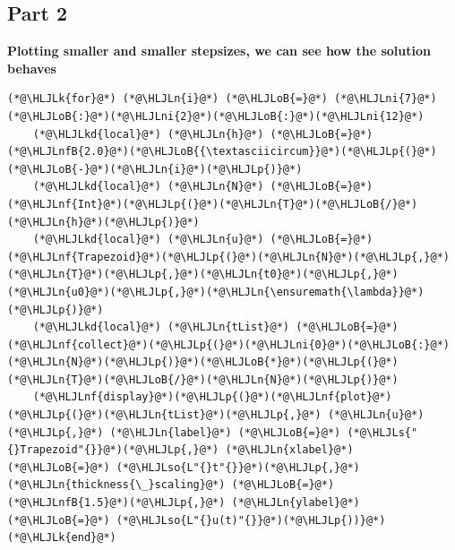 \documentclass[12pt,a4paper]{article}
\newcommand{\HLJLk}[1]{\textcolor[RGB]{148,91,176}{\textbf{#1}}}
\newcommand{\HLJLkd}[1]{\textcolor[RGB]{214,102,97}{\textit{#1}}}
\newcommand{\HLJLn}[1]{#1}
\newcommand{\HLJLnf}[1]{\textcolor[RGB]{66,102,213}{#1}}
\newcommand{\HLJLs}[1]{\textcolor[RGB]{201,61,57}{#1}}
\newcommand{\HLJLso}[1]{\textcolor[RGB]{201,61,57}{#1}}
\newcommand{\HLJLnfB}[1]{\textcolor[RGB]{59,151,46}{#1}}
\newcommand{\HLJLni}[1]{\textcolor[RGB]{59,151,46}{#1}}
\newcommand{\HLJLoB}[1]{\textcolor[RGB]{102,102,102}{\textbf{#1}}}
\newcommand{\HLJLp}[1]{#1}
\begin{document}
\subsection{Part 2}
\textbf{Plotting smaller and smaller stepsizes, we can see how the solution behaves}


\begin{lstlisting}
(*@\HLJLk{for}@*) (*@\HLJLn{i}@*) (*@\HLJLoB{=}@*) (*@\HLJLni{7}@*)(*@\HLJLoB{:}@*)(*@\HLJLni{2}@*)(*@\HLJLoB{:}@*)(*@\HLJLni{12}@*)
    (*@\HLJLkd{local}@*) (*@\HLJLn{h}@*) (*@\HLJLoB{=}@*) (*@\HLJLnfB{2.0}@*)(*@\HLJLoB{{\textasciicircum}}@*)(*@\HLJLp{(}@*)(*@\HLJLoB{-}@*)(*@\HLJLn{i}@*)(*@\HLJLp{)}@*)
    (*@\HLJLkd{local}@*) (*@\HLJLn{N}@*) (*@\HLJLoB{=}@*) (*@\HLJLnf{Int}@*)(*@\HLJLp{(}@*)(*@\HLJLn{T}@*)(*@\HLJLoB{/}@*)(*@\HLJLn{h}@*)(*@\HLJLp{)}@*)
    (*@\HLJLkd{local}@*) (*@\HLJLn{u}@*) (*@\HLJLoB{=}@*) (*@\HLJLnf{Trapezoid}@*)(*@\HLJLp{(}@*)(*@\HLJLn{N}@*)(*@\HLJLp{,}@*)(*@\HLJLn{T}@*)(*@\HLJLp{,}@*)(*@\HLJLn{t0}@*)(*@\HLJLp{,}@*)(*@\HLJLn{u0}@*)(*@\HLJLp{,}@*)(*@\HLJLn{\ensuremath{\lambda}}@*)(*@\HLJLp{)}@*)
    (*@\HLJLkd{local}@*) (*@\HLJLn{tList}@*) (*@\HLJLoB{=}@*) (*@\HLJLnf{collect}@*)(*@\HLJLp{(}@*)(*@\HLJLni{0}@*)(*@\HLJLoB{:}@*)(*@\HLJLn{N}@*)(*@\HLJLp{)}@*)(*@\HLJLoB{*}@*)(*@\HLJLp{(}@*)(*@\HLJLn{T}@*)(*@\HLJLoB{/}@*)(*@\HLJLn{N}@*)(*@\HLJLp{)}@*)
    (*@\HLJLnf{display}@*)(*@\HLJLp{(}@*)(*@\HLJLnf{plot}@*)(*@\HLJLp{(}@*)(*@\HLJLn{tList}@*)(*@\HLJLp{,}@*) (*@\HLJLn{u}@*)(*@\HLJLp{,}@*) (*@\HLJLn{label}@*) (*@\HLJLoB{=}@*) (*@\HLJLs{"{}Trapezoid"{}}@*)(*@\HLJLp{,}@*) (*@\HLJLn{xlabel}@*) (*@\HLJLoB{=}@*) (*@\HLJLso{L"{}t"{}}@*)(*@\HLJLp{,}@*) (*@\HLJLn{thickness{\_}scaling}@*) (*@\HLJLoB{=}@*) (*@\HLJLnfB{1.5}@*)(*@\HLJLp{,}@*) (*@\HLJLn{ylabel}@*)(*@\HLJLoB{=}@*) (*@\HLJLso{L"{}u(t)"{}}@*)(*@\HLJLp{))}@*)
(*@\HLJLk{end}@*)
\end{lstlisting}
\end{document}
